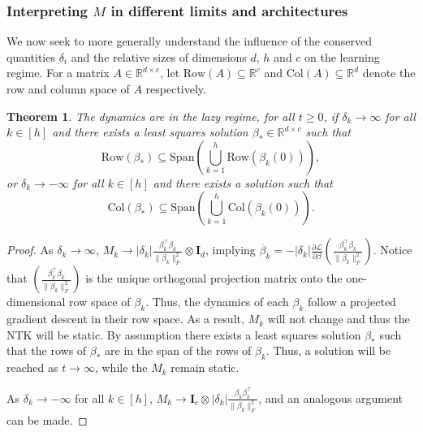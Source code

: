 \documentclass{article}
\theoremstyle{plain}
\newtheorem{theorem}{Theorem}[section]
\theoremstyle{definition}
\theoremstyle{remark}
\begin{document}
\subsubsection{Interpreting \texorpdfstring{$M$}{} in different limits and architectures}
\label{app:wide-deep-linear-network-architectures}

We now seek to more generally understand the influence of the conserved quantities $\delta_i$ and the relative sizes of dimensions $d$, $h$ and $c$ on the learning regime.
%
For a matrix $A \in \mathbb{R}^{d \times c}$, let $\mathrm{Row}(A) \subseteq \mathbb{R}^c$ and $\mathrm{Col}(A) \subseteq \mathbb{R}^d$ denote the row and column space of $A$ respectively.


\begin{theorem}
    \label{theorem:span-beta}
    The dynamics are in the lazy regime, for all $t\ge 0$, if $\delta_k \to \infty$ for all $k\in[h]$ and there exists a least squares solution $\beta_* \in \mathbb{R}^{d \times c}$ such that
    \begin{equation}
        \mathrm{Row}(\beta_*) \subseteq \mathrm{Span}\left( \bigcup_{k=1}^{h} \mathrm{Row}\left(\beta_k(0)\right) \right),
    \end{equation}
    or $\delta_k \to -\infty$ for all $k\in[h]$ and there exists a solution such that
    \begin{equation}
        \mathrm{Col}(\beta_*) \subseteq \mathrm{Span}\left( \bigcup_{k=1}^{h} \mathrm{Col}\left(\beta_k(0)\right) \right).
    \end{equation}
\end{theorem}


\begin{proof}
    As $\delta_k \to \infty$, $M_k \to |\delta_k|\tfrac{\beta_k^\intercal \beta_k}{\|\beta_k\|_F^2} \otimes \mathbf{I}_{d}$, implying $\dot{\beta_k} = -|\delta_k|\frac{\partial \mathcal{L}}{\partial \beta}\left(\tfrac{\beta_k^\intercal \beta_k}{\|\beta_k\|_F^2}\right)$.
    Notice that $\left(\tfrac{\beta_k^\intercal \beta_k}{\|\beta_k\|_F^2}\right)$ is the unique orthogonal projection matrix onto the one-dimensional row space of $\beta_k$.
    Thus, the dynamics of each $\beta_k$ follow a projected gradient descent in their row space.
    As a result, $M_k$ will not change and thus the NTK will be static.
    By assumption there exists a least squares solution $\beta_*$ such that the rows of $\beta_*$ are in the span of the rows of $\beta_k$.
    Thus, a solution will be reached as $t \to \infty$, while the $M_k$ remain static.


    As $\delta_k \to -\infty$ for all $k\in[h]$, $M_k \to \mathbf{I}_{c} \otimes |\delta_k|\tfrac{\beta_k\beta_k^\intercal}{\|\beta_k\|_F^2}$, and an analogous argument can be made.
\end{proof}
\end{document}
